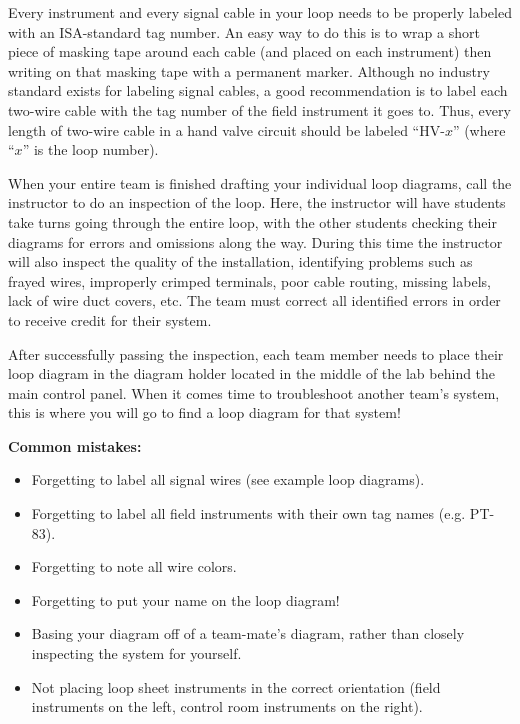 Every instrument and every signal cable in your loop needs to be properly labeled with an ISA-standard tag number.  An easy way to do this is to wrap a short piece of masking tape around each cable (and placed on each instrument) then writing on that masking tape with a permanent marker.  Although no industry standard exists for labeling signal cables, a good recommendation is to label each two-wire cable with the tag number of the field instrument it goes to.  Thus, every length of two-wire cable in a hand valve circuit should be labeled ``HV-$x$'' (where ``$x$'' is the loop number).  

When your entire team is finished drafting your individual loop diagrams, call the instructor to do an inspection of the loop.  Here, the instructor will have students take turns going through the entire loop, with the other students checking their diagrams for errors and omissions along the way.  During this time the instructor will also inspect the quality of the installation, identifying problems such as frayed wires, improperly crimped terminals, poor cable routing, missing labels, lack of wire duct covers, etc.  The team must correct all identified errors in order to receive credit for their system.  

After successfully passing the inspection, each team member needs to place their loop diagram in the diagram holder located in the middle of the lab behind the main control panel.  When it comes time to troubleshoot another team's system, this is where you will go to find a loop diagram for that system!

\vskip 10pt

{\bf Common mistakes:}

\begin{itemize}
\item{} Forgetting to label all signal wires (see example loop diagrams).
\item{} Forgetting to label all field instruments with their own tag names (e.g. PT-83).
\item{} Forgetting to note all wire colors.
\item{} Forgetting to put your name on the loop diagram!
\item{} Basing your diagram off of a team-mate's diagram, rather than closely inspecting the system for yourself.
\item{} Not placing loop sheet instruments in the correct orientation (field instruments on the left, control room instruments on the right).
\end{itemize}


